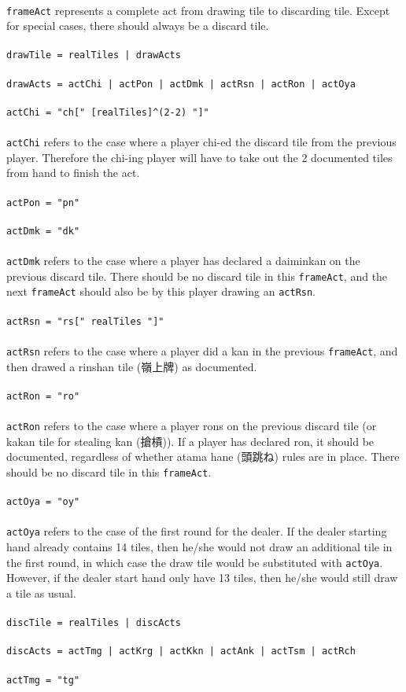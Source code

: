 \documentclass[%
	a4paper%
	,10pt%
	,twoside%
	,notitlepage%
]{article}%
\newcommand*{\ruleSymbol}{\textjapanese{⚠}}%
\newcommand*{\ruleMargin}{\marginpar{\flushright{}\ruleSymbol{}}}%
\newcommand*{\rulePar}{\paragraph*{\ruleMargin{}}}%
\begin{document}
			\paragraph*{}\lstinline/frameAct/ represents a complete act from drawing tile to discarding tile. Except for special cases, there should always be a discard tile. %
			\rulePar{}\lstinline/drawTile = realTiles | drawActs/%
			\rulePar{}\lstinline/drawActs = actChi | actPon | actDmk | actRsn | actRon | actOya /%
			\rulePar{}\lstinline/actChi = "ch[" [realTiles]^(2-2) "]"/%
			\paragraph*{}\lstinline/actChi/ refers to the case where a player chi-ed the discard tile from the previous player. Therefore the chi-ing player will have to take out the 2 documented tiles from hand to finish the act. %
			\rulePar{}\lstinline/actPon = "pn"/%
			\rulePar{}\lstinline/actDmk = "dk"/%
			\paragraph*{}\lstinline/actDmk/ refers to the case where a player has declared a daiminkan on the previous discard tile. There should be no discard tile in this \lstinline/frameAct/, and the next \lstinline/frameAct/ should also be by this player drawing an \lstinline/actRsn/. %
			\rulePar{}\lstinline/actRsn = "rs[" realTiles "]"/%
			\paragraph*{}\lstinline/actRsn/ refers to the case where a player did a kan in the previous \lstinline/frameAct/, and then drawed a rinshan tile (\textjapanese{嶺上牌}) as documented. %
			\rulePar{}\lstinline/actRon = "ro"/%
			\paragraph*{}\lstinline/actRon/ refers to the case where a player rons on the previous discard tile (or kakan tile for stealing kan (\textjapanese{搶槓})). If a player has declared ron, it should be documented, regardless of whether atama hane (\textjapanese{頭跳ね}) rules are in place. There should be no discard tile in this \lstinline/frameAct/. %
			\rulePar{}\lstinline/actOya = "oy"/%
			\paragraph*{}\lstinline/actOya/ refers to the case of the first round for the dealer. If the dealer starting hand already contains 14 tiles, then he/she would not draw an additional tile in the first round, in which case the draw tile would be substituted with \lstinline/actOya/. However, if the dealer start hand only have 13 tiles, then he/she would still draw a tile as usual. %
			\rulePar{}\lstinline/discTile = realTiles | discActs/%
			\rulePar{}\lstinline/discActs = actTmg | actKrg | actKkn | actAnk | actTsm | actRch/%
			\rulePar{}\lstinline/actTmg = "tg"/%
\end{document}

